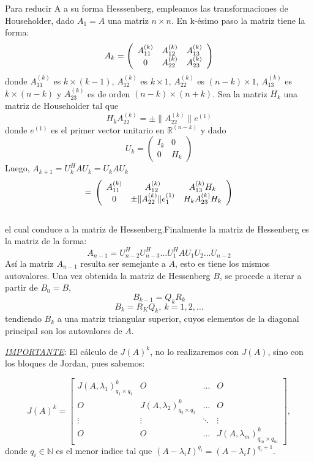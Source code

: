\documentclass[12pt,a4paper]{article}
\begin{document}
\begin{multicols}{2}
\noindent Para reducir A a su forma Hesssenberg, empleamos las transformaciones de Householder, dado $A_{1}=A$ una matriz $n\times n$. En k-ésimo paso la matriz tiene la forma:\\
$$A_{k}=\left(\begin{array}{c c c}
A_{11}^{(k)} & A_{12}^{(k)} & A_{13}^{(k)} \\
0          & A_{22}^{(k)} & A_{23}^{(k)}
\end{array}\right)$$ donde $A_{11}^{(k)}$ es $k\times (k-1)$, $A_{12}^{(k)}$ es $k\times1$, $A_{22}^{(k)}$ es $(n-k)\times1$, $A_{13}^{(k)}$ es $k\times(n-k)$ y $A_{23}^{(k)}$ es de orden $(n-k)\times(n+k)$. Sea la matriz $H_{k}$ una matriz de Householder tal que $$H_{k}A_{22}^{(k)}=\pm\|A_{22}^{(k)}\|e^{(1)}$$ donde $e^{(1)}$ es el primer vector unitario en $\mathbb{R}^{(n-k)}$
y dado $$U_{k}=\left(\begin{array}{cc}
I_{k}  & 0 \\
0 & H_{k}
\end{array}\right)$$
Luego, $A_{k+1}=U_{k}^{H}AU_{k}=U_{k}AU_{k}$
$$=\newline\left(\begin{array}{c c c}
A_{11}^{(k)}    & A_{12}^{(k)}                  & A_{13}^{(k)}H_{k} \\
0             & \pm\|A_{22}^{(k)}\|e_{1}^{(1)} & H_{k}A_{23}^{(k)}H_{k}
\end{array}\right)$$\\
el cual conduce a la matriz de Hessenberg.Finalmente la matriz de Hessenberg es la matriz de la forma:\\
$$A_{n-1}=U_{n-2}^{H}U_{n-3}^{H}\dots U_{1}^{H}AU_{1}U_{2}\dots U_{n-2}$$
Así la  matriz $A_{n-1}$ resulta ser semejante a $A$, esto es tiene los mismos autovalores. Una vez obtenida la matriz de Hessenberg $B$, se procede a iterar a partir de $B_{0}=B$,$$B_{k-1} = Q_{k}R_{k}$$
$$B_{k}=R_{K}Q_{k}, \  k=1, 2, \dots$$ tendiendo $B_{k}$ a una matriz triangular superior, cuyos elementos de la diagonal principal son los autovalores de $A$.


\end{multicols}

\noindent\textit{\underline{IMPORTANTE}}:
El cálculo de $J(A)^{k}$, no lo realizaremos con $J(A)$, sino con los bloques de Jordan, pues sabemos:

$$
J(A)^k = \begin{bmatrix}
J(A, \lambda_{1})^k_{q_{1}\times q_{1}}&O&\ldots&O\\
O&J(A, \lambda_{2})^k_{q_{2}\times q_{2}}&\ldots&O\\
\vdots&\vdots& \ddots& \vdots\\
O&O&\ldots&J(A, \lambda_{m})^k_{q_{m}\times q_{m}}
\end{bmatrix},
$$
donde $q_{i}\in\mathbb{N}$ es el menor indice tal que $(A-\lambda_{i}I)^{q_{i}} = (A-\lambda_{i}I)^{q_{i}+1}$.
\end{document}
